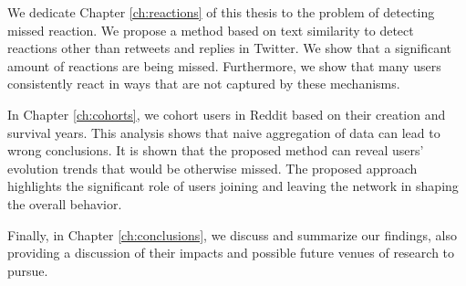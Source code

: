 We dedicate Chapter \ref{ch:reactions} of this thesis to the problem of detecting missed reaction. We propose a method based on text similarity to detect reactions other than retweets and replies in Twitter. We show that a significant amount of reactions are being missed. Furthermore, we show that many users consistently react in ways that are not captured by these mechanisms.

In Chapter \ref{ch:cohorts}, we cohort users in Reddit based on their creation and survival years. This analysis shows that naive aggregation of data can lead to wrong conclusions. It is shown that the proposed method can reveal users' evolution trends that would be otherwise missed. The proposed approach highlights the significant role of users joining and leaving the network in shaping the overall behavior.

Finally, in Chapter \ref{ch:conclusions}, we discuss and summarize our findings, also providing a discussion of their impacts and possible future venues of research to pursue.